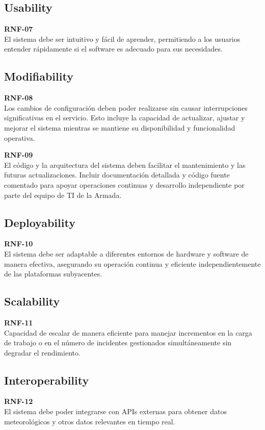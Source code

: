 \subsection{Usability}

\textbf{RNF-07}\\
El sistema debe ser intuitivo y fácil de aprender, permitiendo a los usuarios entender rápidamente si el software es adecuado para sus necesidades.


\subsection{Modifiability}

\textbf{RNF-08}\\
Los cambios de configuración deben poder realizarse sin causar interrupciones significativas en el servicio. Esto incluye la capacidad de actualizar, ajustar y 
mejorar el sistema mientras se mantiene su disponibilidad y funcionalidad operativa.

\textbf{RNF-09}\\
El código y la arquitectura del sistema deben facilitar el mantenimiento y las futuras actualizaciones. Incluir documentación detallada y código fuente comentado 
para apoyar operaciones continuas y desarrollo independiente por parte del equipo de TI de la Armada.


\subsection{Deployability}

\textbf{RNF-10}\\
El sistema debe ser adaptable a diferentes entornos de hardware y software de manera efectiva, asegurando su operación continua y eficiente independientemente de las plataformas subyacentes.

\subsection{Scalability}

\textbf{RNF-11}\\
Capacidad de escalar de manera eficiente para manejar incrementos en la carga de trabajo o en el número de incidentes gestionados simultáneamente sin degradar el rendimiento.

\subsection{Interoperability}

\textbf{RNF-12}\\
El sistema debe poder integrarse con APIs externas para obtener datos meteorológicos y otros datos relevantes en tiempo real.